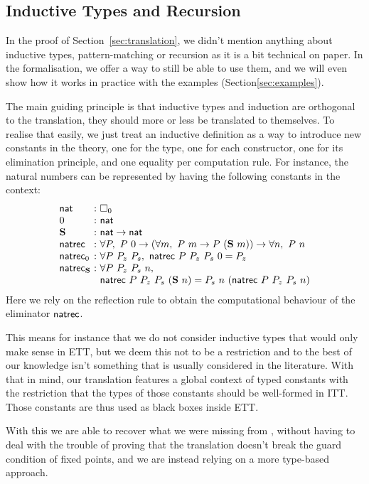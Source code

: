\subsection{Inductive Types and Recursion}
\label{sec:inductives}

In the proof of Section~\ref{sec:translation}, we didn't mention
anything about inductive types, pattern-matching or recursion as it is
a bit technical on paper.  In the formalisation, we offer a way to
still be able to use them, and we will even show how it works in
practice with the examples (Section\ref{sec:examples}).

The main guiding principle is that inductive types and induction are orthogonal
to the translation, they should more or less be translated to
themselves.
%
To realise that easily, we just treat an inductive definition as a way
to introduce new constants in the theory, one for the type, one for
each constructor, one for its elimination principle, and one equality
per computation rule.
%
For instance, the natural numbers can be represented by having the following
constants in the context:
%
\[
\begin{array}{l@{~}c@{~}l}
  \nat &:& \Ty{0} \\
  \zero &:& \nat \\
  \natsucc &:& \nat \to \nat \\
  \natrec &:& \forall P,\
  P\ \zero \to (\forall m,\ P\ m \to P\ (\natsucc\ m)) \to
  \forall n,\ P\ n \\
  \natrec_\zero &:& \forall P\ P_z\ P_s,\ \natrec\ P\ P_z\ P_s\ \zero = P_z \\
  \natrec_\natsucc &:& \forall P\ P_z\ P_s\ n,\\
  &&\natrec\ P\ P_z\ P_s\ (\natsucc\ n) = P_s\ n\ (\natrec\ P\ P_z\ P_s\ n)
\end{array}
\]
%
Here we rely on the reflection rule to obtain the computational behaviour of the
eliminator $\mathsf{natrec}$.

This means for instance that we do not consider inductive types that would only
make sense in ETT, but we deem this not to be a restriction and to the best of
our knowledge isn't something that is usually considered in the literature.
%
With that in mind, our translation features a global context of typed constants
with the restriction that the types of those constants should be well-formed
in ITT. Those constants are thus used as black boxes inside ETT.

With this we are able to recover what we were missing from
\Coq, without having to deal with the trouble of proving that the translation
doesn't break the guard condition of fixed points, and we are instead relying on
a more type-based approach.

